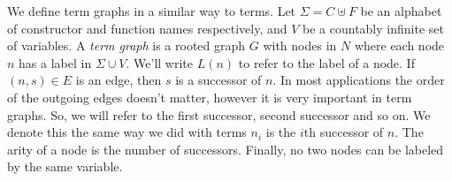\documentclass{book}
\theoremstyle{definition}
\begin{document}
We define term graphs in a similar way to terms.
Let $\Sigma = C \uplus F$ be an alphabet of constructor and function names respectively,
and $V$ be a countably infinite set of variables.
A \emph{term graph} is a rooted graph $G$ with nodes in
$N$ where each node $n$ has a label in $\Sigma \cup V$.
We'll write $L(n)$ to refer to the label of a node.
If $(n, s) \in E$ is an edge, then $s$ is a successor of $n$.
In most applications the order of the outgoing edges doesn't matter, 
however it is very important in term graphs.
So, we will refer to the first successor, second successor and so on.
We denote this the same way we did with terms $n_i$ is the $i$th successor of $n$.
The arity of a node is the number of successors.
Finally, no two nodes can be labeled by the same variable.

\end{document}
